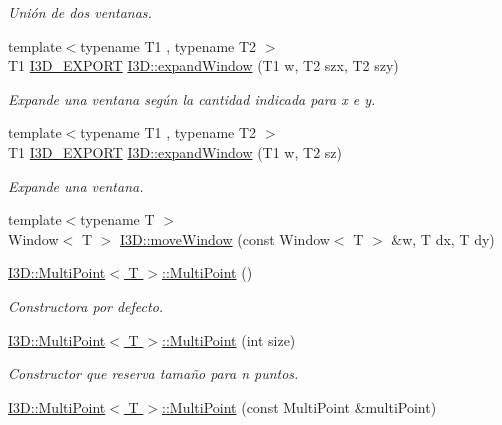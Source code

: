 \begin{DoxyCompactItemize}
\begin{DoxyCompactList}\small\item\em Unión de dos ventanas. \end{DoxyCompactList}\item 
{\footnotesize template$<$typename T1 , typename T2 $>$ }\\T1 \hyperlink{defs_8h_a83f373279ee1ca96b4003c673142ec1d}{I3\+D\+\_\+\+E\+X\+P\+O\+RT} \hyperlink{group___geometric_entities_ga8ad6c6751aee604442e1a5287b1d0119}{I3\+D\+::expand\+Window} (T1 w, T2 szx, T2 szy)
\begin{DoxyCompactList}\small\item\em Expande una ventana según la cantidad indicada para x e y. \end{DoxyCompactList}\item 
{\footnotesize template$<$typename T1 , typename T2 $>$ }\\T1 \hyperlink{defs_8h_a83f373279ee1ca96b4003c673142ec1d}{I3\+D\+\_\+\+E\+X\+P\+O\+RT} \hyperlink{group___geometric_entities_ga857396c24d042125f346f288db8e1fa2}{I3\+D\+::expand\+Window} (T1 w, T2 sz)
\begin{DoxyCompactList}\small\item\em Expande una ventana. \end{DoxyCompactList}\item 
{\footnotesize template$<$typename T $>$ }\\Window$<$ T $>$ \hyperlink{group___geometric_entities_ga5893c61910bdaf13dcbd435f1914d868}{I3\+D\+::move\+Window} (const Window$<$ T $>$ \&w, T dx, T dy)
\item 
\hyperlink{group___geometric_entities_ga15cd19a3ddf5a39c3154efe440dde6c7}{I3\+D\+::\+Multi\+Point$<$ T $>$\+::\+Multi\+Point} ()
\begin{DoxyCompactList}\small\item\em Constructora por defecto. \end{DoxyCompactList}\item 
\hyperlink{group___geometric_entities_ga5581044092b6db2870f35347c8af5b73}{I3\+D\+::\+Multi\+Point$<$ T $>$\+::\+Multi\+Point} (int size)
\begin{DoxyCompactList}\small\item\em Constructor que reserva tamaño para n puntos. \end{DoxyCompactList}\item 
\hyperlink{group___geometric_entities_gaadc33d9d15e6fe63040915f1f39d9b40}{I3\+D\+::\+Multi\+Point$<$ T $>$\+::\+Multi\+Point} (const Multi\+Point \&multi\+Point)

\end{DoxyCompactItemize}

